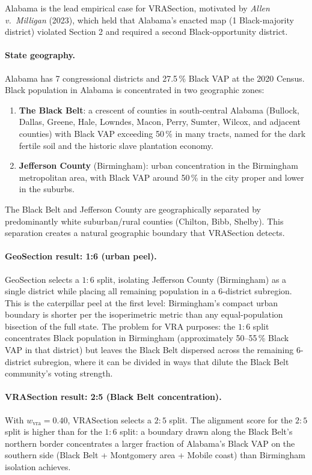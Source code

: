 Alabama is the lead empirical case for VRASection, motivated by
\emph{Allen v.\ Milligan} (2023), which held that Alabama's enacted map
(1 Black-majority district) violated Section 2 and required a second
Black-opportunity district.

\paragraph{State geography.}
Alabama has 7 congressional districts and 27.5\,\% Black VAP at the
2020 Census.
Black population in Alabama is concentrated in two geographic zones:
\begin{enumerate}
\item \textbf{The Black Belt}: a crescent of counties in south-central Alabama
  (Bullock, Dallas, Greene, Hale, Lowndes, Macon, Perry, Sumter,
  Wilcox, and adjacent counties) with Black VAP exceeding 50\,\% in many tracts,
  named for the dark fertile soil and the historic slave plantation economy.
\item \textbf{Jefferson County} (Birmingham): urban concentration in the
  Birmingham metropolitan area, with Black VAP around 50\,\% in the city
  proper and lower in the suburbs.
\end{enumerate}
The Black Belt and Jefferson County are geographically separated by
predominantly white suburban/rural counties (Chilton, Bibb, Shelby).
This separation creates a natural geographic boundary that VRASection detects.

\paragraph{GeoSection result: 1:6 (urban peel).}
GeoSection selects a $1:6$ split, isolating Jefferson County (Birmingham)
as a single district while placing all remaining population in a $6$-district
subregion.
This is the caterpillar peel at the first level: Birmingham's compact urban
boundary is shorter per the isoperimetric metric than any equal-population
bisection of the full state.
The problem for VRA purposes: the $1:6$ split concentrates Black population
in Birmingham (approximately 50--55\,\% Black VAP in that district) but
leaves the Black Belt dispersed across the remaining 6-district subregion,
where it can be divided in ways that dilute the Black Belt community's
voting strength.

\paragraph{VRASection result: 2:5 (Black Belt concentration).}
With $w_\text{vra} = 0.40$, VRASection selects a $2:5$ split.
The alignment score for the $2:5$ split is higher than for the $1:6$ split:
a boundary drawn along the Black Belt's northern border concentrates a
larger fraction of Alabama's Black VAP on the southern side (Black Belt +
Montgomery area + Mobile coast) than Birmingham isolation achieves.

